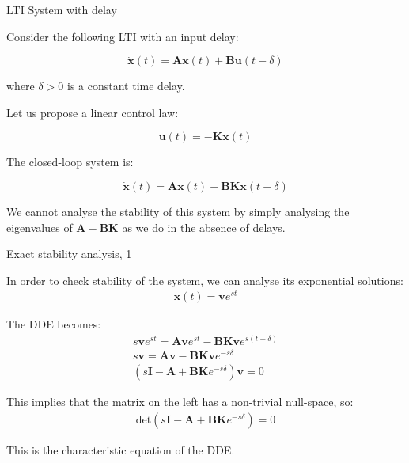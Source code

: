 \documentclass{beamer}
\begin{document}
\begin{frame}{LTI System with delay}
\begin{flushleft}

Consider the following LTI with an input delay:

\begin{equation}
    \dot{\mathbf{x}}(t) = \mathbf{A} \mathbf{x}(t) + \mathbf{B} \mathbf{u}(t - \delta)
\end{equation}

where $\delta > 0$ is a constant time delay.

\bigskip

Let us propose a linear control law:

\begin{equation}
	\mathbf{u}(t) = -\mathbf{K} \mathbf{x}(t)
\end{equation}

\bigskip

The closed-loop system is: 

\begin{equation}
	\dot{\mathbf{x}}(t) = \mathbf{A} \mathbf{x}(t) - \mathbf{B} \mathbf{K}  \mathbf{x}(t - \delta)
\end{equation}

We cannot analyse the stability of this system  by simply analysing the eigenvalues of $\mathbf{A} - \mathbf{B}\mathbf{K}$ as we do in the absence of delays.


\end{flushleft}
\end{frame}




\begin{frame}{Exact stability analysis, 1}
	\begin{flushleft}
		
		In order to check stability of the system, we can analyse its exponential solutions:
		\begin{align}
			\mathbf{x}(t) = \mathbf{v} e^{s t} 
		\end{align}
		
		The DDE becomes:
		\begin{align}
			s \mathbf{v} e^{s t}  = \mathbf{A} \mathbf{v} e^{s t}  - \mathbf{B} \mathbf{K}\mathbf{v} e^{s (t - \delta)}
			\\
			s \mathbf{v}  = \mathbf{A} \mathbf{v}  - \mathbf{B} \mathbf{K}\mathbf{v} e^{-s \delta}
			\\
			(s\mathbf{I} - \mathbf{A} + \mathbf{B} \mathbf{K} e^{-s \delta}) \mathbf{v} = 0
		\end{align}
		
		This implies that the matrix on the left has a non-trivial null-space, so:
		\begin{align}
			\text{det}\left(s\mathbf{I} - \mathbf{A} + \mathbf{B} \mathbf{K} e^{-s \delta} \right) = 0
		\end{align}
		
		This is the characteristic equation of the DDE.
		
	\end{flushleft}
\end{frame}
\end{document}
